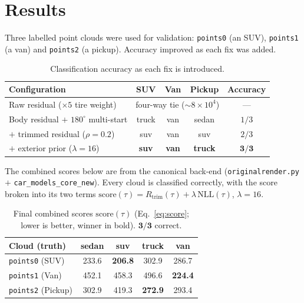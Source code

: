\documentclass[11pt]{article}
\newcommand{\Rtrim}{R_{\text{trim}}}
\newcommand{\NLL}{\text{NLL}}
\theoremstyle{definition}
\begin{document}
\section{Results}

Three labelled point clouds were used for validation: \texttt{points0} (an SUV),
\texttt{points1} (a van) and \texttt{points2} (a pickup). Accuracy improved as
each fix was added.

\begin{table}[h]
\centering
\begin{tabular}{lcccc}
\toprule
\textbf{Configuration} & \textbf{SUV} & \textbf{Van} & \textbf{Pickup} & \textbf{Accuracy} \\
\midrule
Raw residual ($\times 5$ tire weight) & \multicolumn{3}{c}{four-way tie ($\sim 8\times 10^4$)} & --- \\
Body residual $+$ $180^\circ$ multi-start & truck & van & sedan & $1/3$ \\
\quad $+$ trimmed residual ($\rho=0.2$) & suv & van & suv & $2/3$ \\
\quad $+$ exterior prior ($\lambda=16$) & \textbf{suv} & \textbf{van} & \textbf{truck} & $\mathbf{3/3}$ \\
\bottomrule
\end{tabular}
\caption{Classification accuracy as each fix is introduced.}
\end{table}

\noindent The combined scores below are from the canonical back-end
(\texttt{originalrender.py} $+$ \texttt{car\_models\_core\_new}). Every cloud is
classified correctly, with the score broken into its two terms
$\text{score}(\tau)=\Rtrim(\tau)+\lambda\,\NLL(\tau)$, $\lambda=16$.

\begin{table}[h]
\centering
\begin{tabular}{lcccc}
\toprule
\textbf{Cloud (truth)} & \textbf{sedan} & \textbf{suv} & \textbf{truck} & \textbf{van} \\
\midrule
\texttt{points0} (SUV)    & 233.6 & \textbf{206.8} & 302.9 & 286.7 \\
\texttt{points1} (Van)    & 452.1 & 458.3 & 496.6 & \textbf{224.4} \\
\texttt{points2} (Pickup) & 302.9 & 419.3 & \textbf{272.9} & 293.4 \\
\bottomrule
\end{tabular}
\caption{Final combined scores $\text{score}(\tau)$ (Eq.~\eqref{eq:score}; lower is better, winner in bold). $\mathbf{3/3}$ correct.}
\end{table}
\end{document}

